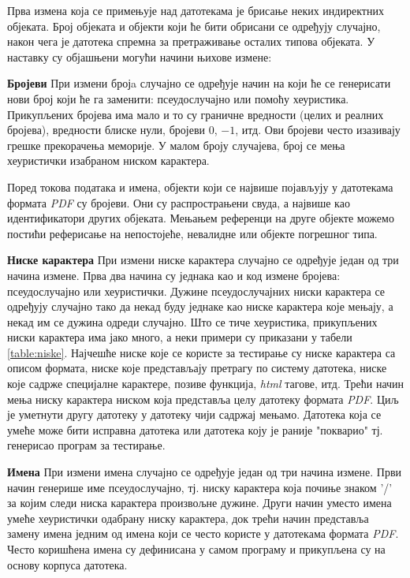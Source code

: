 \documentclass[12pt,oneside]{memoir}
\begin{document}
Прва измена која се примењује над датотекама је брисање неких индиректних објеката. Број објеката и објекти који ће бити обрисани се одређују случајно, након чега је датотека спремна за претраживање осталих типова објеката.
У наставку су објашњени могући начини њихове измене:
\begin{description}
\item{\textbf{Бројеви}} При измени бројa случајно се одређује начин на који ће се генерисати нови број који ће га заменити: псеудослучајно или помоћу хеуристика. Прикупљених бројева има мало и то су граничне вредности (целих и реалних бројева), вредности блиске нули, бројеви $0$, $-1$, итд. Ови бројеви често изазивају грешке прекорачења меморије. У малом броју случајева, број се мења хеуристички изабраном ниском карактера. 

Поред токова података и имена, објекти који се највише појављују у датотекама формата \textit{PDF} су бројеви. Они су распрострањени свуда, а највише као идентификатори других објеката. Мењањем референци на друге објекте можемо постићи реферисање на непостојеће, невалидне или објекте погрешног типа.  
\item{\textbf{Ниске карактера}} При измени ниске карактера случајно се одређује један од три начина измене. Прва два начина су једнака као и код измене бројева: псеудослучајно или хеуристички. Дужине псеудослучајних ниски карактера се одређују случајно тако да некад буду једнаке као ниске карактера које мењају, а некад им се дужина одреди случајно. Што се тиче хеуристика, прикупљених ниски карактера има јако много, а неки примери су приказани у табели \ref{table:niske}. Најчешће ниске које се користе за тестирање су ниске карактера са описом формата, ниске које представљају претрагу по систему датотека, ниске које садрже специјалне карактере, позиве функција, \textit{html} тагове, итд. Трећи начин мења ниску карактера ниском која представља целу датотеку формата \textit{PDF}. Циљ је уметнути другу датотеку у датотеку чији садржај мењамо. Датотека која се умеће може бити исправна датотека или датотека коју је раније "покварио" тј. генерисао програм за тестирање.
\item{\textbf{Имена}} При измени имена случајно се одређује један од три начина измене. Први начин генерише име псеудослучајно, тј. ниску карактера која почиње знаком '/' за којим следи ниска карактера произвољне дужине. Други начин уместо имена умеће хеуристички одабрану ниску карактера, док трећи начин представља замену имена једним од имена који се често користе у датотекама формата \textit{PDF}. Често коришћена имена су дефинисана у самом програму и прикупљена су на основу корпуса датотека.

\end{description}
\end{document}
